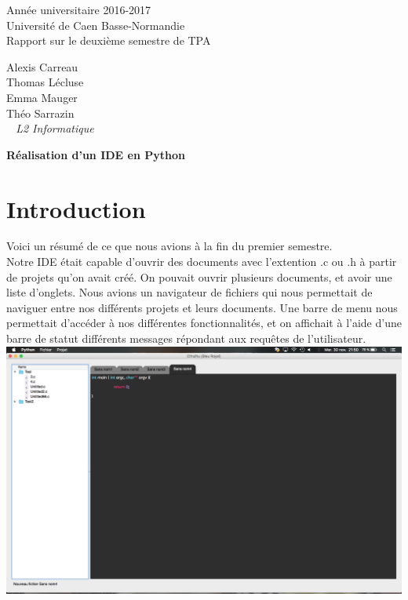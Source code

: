 \documentclass[a4paper,12pt]{article}
\begin{document}
\begin{titlepage}
	\begin{center}
		\Large{Année universitaire 2016-2017}\\
		\Large{Université de Caen Basse-Normandie}\\[1cm]
		
		\huge{Rapport sur le deuxième semestre de TPA}\\
		\vspace{3cm}
		
		Alexis Carreau\\
		Thomas Lécluse\\
		Emma Mauger\\
		Théo Sarrazin\\
		
		\normalsize{\textit{ ~ L2 Informatique}}\\
		\medskip
		\vspace{2cm}
		
		\huge{\textbf{Réalisation d'un IDE en Python}}
		
	\end{center}
\end{titlepage}

\tableofcontents
\newpage

\section{Introduction}

	Voici un résumé de ce que nous avions à la fin du premier semestre.\\
	
	Notre IDE était capable d'ouvrir des documents avec l'extention .c ou .h à partir de projets qu'on avait créé. On pouvait ouvrir plusieurs documents, et avoir une liste d'onglets. Nous avions un navigateur de fichiers qui nous permettait de naviguer entre nos différents projets et leurs documents. Une barre de menu nous permettait d'accéder à nos différentes fonctionnalités, et on affichait à l'aide d'une barre de statut différents messages répondant aux requêtes de l'utilisateur.\\
	
	\includegraphics[scale=0.3]{images/ide_v1.png}
	
\end{document}
